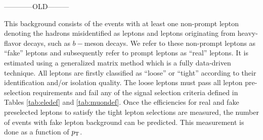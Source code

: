 
------------OLD---------

This background consists of the events with at least one non-prompt lepton denoting the hadrons misidentified as leptons and leptons originating from heavy-flavor decays, such as $b-$meson decays. We refer to these non-prompt leptons as ``fake'' leptons and subsequently refer to prompt leptons as ``real'' leptons. It is estimated using a generalized matrix method 
which is a fully data-driven technique. All leptons are firstly classified as ``loose'' or ``tight'' according to their identification and/or isolation quality. The loose leptons must pass all lepton pre-selection requirements and fail any of the signal selection criteria defined in Tables \ref{tab:eledef} and \ref{tab:muondef}. Once the efficiencies for real and fake preselected leptons to satisfy the tight lepton selections are measured, the number of events with fake lepton background can be predicted. This measurement is done as a function of $p_{\mathrm{T}}$. %


